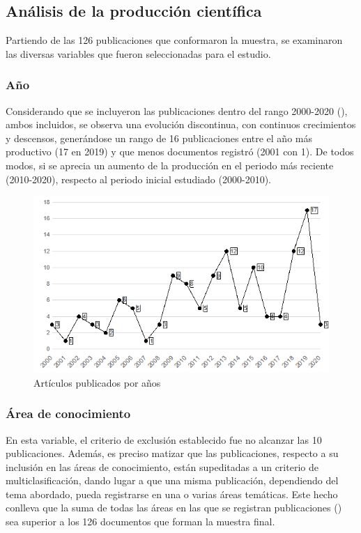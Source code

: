 \documentclass[spanish]{textolivre}
\begin{document}
\subsection{Análisis de la producción científica}

Partiendo de las 126 publicaciones que conformaron la muestra, se examinaron las diversas variables que fueron seleccionadas para el estudio.

\subsubsection{Año}

Considerando que se incluyeron las publicaciones dentro del rango 2000-2020 (), ambos incluidos, se observa una evolución discontinua, con continuos crecimientos y descensos, generándose un rango de 16 publicaciones entre el año más productivo (17 en 2019) y que menos documentos registró (2001 con 1). De todos modos, si se aprecia un aumento de la producción en el periodo más reciente (2010-2020), respecto al periodo inicial estudiado (2000-2010).

\begin{figure}[h!]
\centering
\begin{minipage}{.8\textwidth}
 \includegraphics[width=\textwidth]{fig2.png}
 \caption{Artículos publicados por años}
 \label{fig2}
\end{minipage}
\end{figure}

\subsubsection{Área de conocimiento}

En esta variable, el criterio de exclusión establecido fue no alcanzar las 10 publicaciones. Además, es preciso matizar que las publicaciones, respecto a su inclusión en las áreas de conocimiento, están supeditadas a un criterio de multiclasificación, dando lugar a que una misma publicación, dependiendo del tema abordado, pueda registrarse en una o varias áreas temáticas. Este hecho conlleva que la suma de todas las áreas en las que se registran publicaciones () sea superior a los 126 documentos que forman la muestra final.
\end{document}
